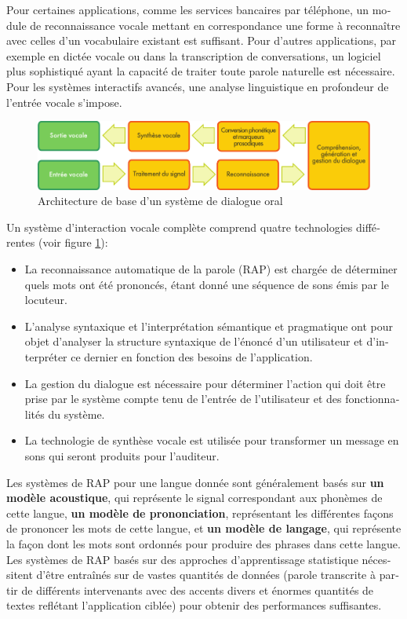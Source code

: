 \begin{french}
\begin{multicols}{2}
Pour certaines applications, comme les services bancaires par
téléphone, un module de reconnaissance vocale mettant en
correspondance une forme à reconnaître avec celles d'un vocabulaire
existant est suffisant. Pour d'autres applications, par exemple en
dictée vocale ou dans la transcription de conversations, un logiciel
plus sophistiqué ayant la capacité de traiter toute parole naturelle
est nécessaire. Pour les systèmes interactifs avancés, une analyse
linguistique en profondeur de l'entrée vocale s'impose.

\begin{figure}[!ht]
\begin{center}
 \includegraphics[width=\textwidth]{../_media/french/simple_speech-based_dialogue_architecture} 
\caption{Architecture de base d'un système de dialogue oral}
\label{fig:slds}
\end{center}
\end{figure}

Un système d'interaction vocale complète comprend quatre technologies
différentes (voir figure \ref{fig:slds}):
\begin{itemize}
\item La reconnaissance automatique de la parole (RAP) est chargée de
  déterminer quels mots ont été prononcés, étant donné une
  séquence de sons émis par le locuteur.
\item L'analyse syntaxique et l'interprétation sémantique et
  pragmatique ont pour objet d'analyser la structure syntaxique de
  l'énoncé d'un utilisateur et d'interpréter ce dernier en fonction
  des besoins de l'application.
\item La gestion du dialogue est nécessaire pour déterminer l'action
  qui doit être prise par le système compte tenu de l'entrée de
  l'utilisateur et des fonctionnalités du système.
\item La technologie de synthèse vocale est utilisée pour transformer
  un message en sons qui seront produits pour l'auditeur.
\end{itemize}

Les systèmes de RAP pour une langue donnée sont généralement basés sur
{\bf un modèle acoustique}, qui représente le signal correspondant aux
phonèmes de cette langue, {\bf un modèle de prononciation},
représentant les différentes façons de prononcer les mots de cette
langue, et {\bf un modèle de langage}, qui représente la façon dont
les mots sont ordonnés pour produire des phrases dans cette
langue. Les systèmes de RAP basés sur des approches d'apprentissage statistique nécessitent d'être entraînés sur
de vastes quantités de données (parole transcrite à partir de
différents intervenants avec des accents divers et énormes quantités
de textes reflétant l'application ciblée) pour obtenir des
performances suffisantes.


\end{multicols}
\end{french}
